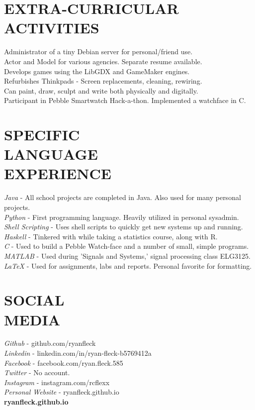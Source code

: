 \documentclass[margin]{res}
\begin{document}
\begin{resume}
\section{EXTRA-CURRICULAR \\ ACTIVITIES}        
Administrator of a tiny Debian server for personal/friend use.\\     
           	Actor and Model for various agencies. Separate resume available.\\
           	Develops games using the LibGDX and GameMaker engines. \\
           	Refurbishes Thinkpads - Screen replacements, cleaning, rewiring.\\
           	Can paint, draw, sculpt and write both physically and digitally.\\
           	Participant in Pebble Smartwatch Hack-a-thon. Implemented a watchface in C.\\
           	
 
\section{SPECIFIC \\ LANGUAGE \\ EXPERIENCE}        
{\sl Java} - All school projects are completed in Java. Also used for many personal projects.\\
{\sl Python} - First programming language. Heavily utilized in personal sysadmin.\\
{\sl Shell Scripting} - Uses shell scripts to quickly get new systems up and running.\\
{\sl Haskell} -  Tinkered with while taking a statistics course, along with R.\\
{\sl C} - Used to build a Pebble Watch-face and a number of small, simple programs.\\
{\sl MATLAB} - Used during 'Signals and Systems,' signal processing class ELG3125.\\
{\sl LaTeX} -  Used for assignments, labs and reports. Personal favorite for formatting.\\
           	
\section{SOCIAL \\ MEDIA}        
{\sl Github} - github.com/ryanfleck \\
{\sl Linkedin} - linkedin.com/in/ryan-fleck-b5769412a \\
{\sl Facebook} - facebook.com/ryan.fleck.585 \\
{\sl Twitter} - No account. \\
{\sl Instagram} - instagram.com/rcflexx \\
{\sl Personal Website} - ryanfleck.github.io \\
 
 \vfill
 {\hfill\large\bf ryanfleck.github.io}
 

\end{resume}
\end{document}
